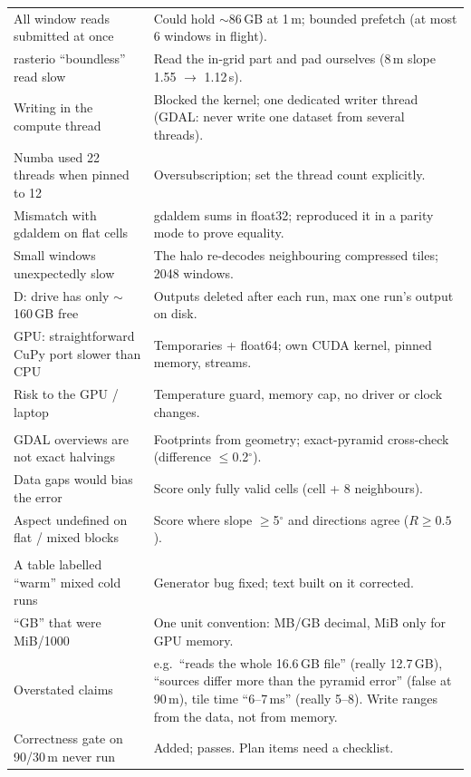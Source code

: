 ﻿\documentclass[11pt,a4paper]{article}
\begin{document}
\begin{longtable}{>{\raggedright\arraybackslash}p{5.2cm}>{\raggedright\arraybackslash}p{10.2cm}}
All window reads submitted at once & Could hold $\sim$86\,GB at 1\,m; bounded prefetch (at most 6 windows in flight). \\
rasterio ``boundless'' read slow & Read the in-grid part and pad ourselves (8\,m slope 1.55 $\to$ 1.12\,s). \\
Writing in the compute thread & Blocked the kernel; one dedicated writer thread (GDAL: never write one dataset from several threads). \\
Numba used 22 threads when pinned to 12 & Oversubscription; set the thread count explicitly. \\
Mismatch with gdaldem on flat cells & gdaldem sums in float32; reproduced it in a parity mode to prove equality. \\
Small windows unexpectedly slow & The halo re-decodes neighbouring compressed tiles; 2048 windows. \\
D: drive has only $\sim$160\,GB free & Outputs deleted after each run, max one run's output on disk. \\
GPU: straightforward CuPy port slower than CPU & Temporaries + float64; own CUDA kernel, pinned memory, streams. \\
Risk to the GPU / laptop & Temperature guard, memory cap, no driver or clock changes. \\
\midrule
\multicolumn{2}{l}{\textit{Phase 4}} \\
GDAL overviews are not exact halvings & Footprints from geometry; exact-pyramid cross-check (difference $\leq$0.2$^\circ$). \\
Data gaps would bias the error & Score only fully valid cells (cell + 8 neighbours). \\
Aspect undefined on flat / mixed blocks & Score where slope $\geq$5$^\circ$ and directions agree ($R\geq0.5$). \\
\midrule
\multicolumn{2}{l}{\textit{Audit (found by checking every number)}} \\
A table labelled ``warm'' mixed cold runs & Generator bug fixed; text built on it corrected. \\
``GB'' that were MiB/1000 & One unit convention: MB/GB decimal, MiB only for GPU memory. \\
Overstated claims & e.g.\ ``reads the whole 16.6\,GB file'' (really 12.7\,GB), ``sources differ more than the pyramid error''
(false at 90\,m), tile time ``6--7\,ms'' (really 5--8). Write ranges from the data, not from memory. \\
Correctness gate on 90/30\,m never run & Added; passes. Plan items need a checklist. \\

\end{longtable}
\end{document}
